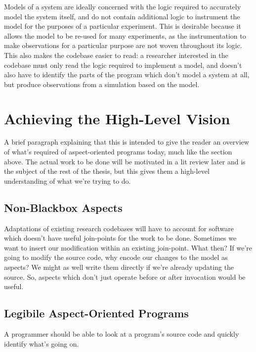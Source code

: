 Models of a system are ideally concerned with the logic required to accurately
model the system itself, and do not contain additional logic to instrument the
model for the purposes of a particular experiment. This is desirable because it
allows the model to be re-used for many experiments, as the instrumentation to
make observations for a particular purpose are not woven throughout its logic.
This also makes the codebase easier to read: a researcher interested in the
codebase must only read the logic required to implement a model, and doesn't
also have to identify the parts of the program which don't model a system at
all, but produce observations from a simulation based on the model.




\section{Achieving the High-Level Vision}

A brief paragraph explaining that this is intended to give the reader an
overview of what's required of aspect-oriented programs today, much like the
section above. The actual work to be done will be motivated in a lit review
later and is the subject of the rest of the thesis, but this gives them a
high-level understanding of what we're trying to do.


\subsection{Non-Blackbox Aspects}

Adaptations of existing research codebases will have to account for software
which doesn't have useful join-points for the work to be done. Sometimes we want
to insert our modification within an existing join-point. What then? If we're
going to modify the source code, why encode our changes to the model as aspects?
We might as well write them directly if we're already updating the source. So,
aspects which don't just operate before or after invocation would be useful.


\subsection{Legibile Aspect-Oriented Programs}

A programmer should be able to look at a program's source code and quickly
identify what's going on.




